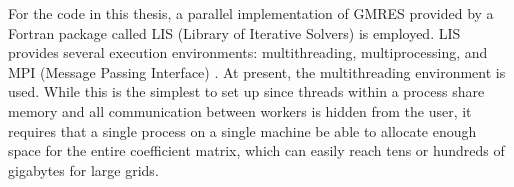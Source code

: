 For the code in this thesis, a parallel implementation of GMRES provided by a Fortran package called LIS (Library of Iterative Solvers) \cite{nishida_experience_2010} is employed.
LIS provides several execution environments: multithreading, multiprocessing, and MPI (Message Passing Interface) \cite{message_passing_interface_forum_mpi:_1993}.
At present, the multithreading environment is used.
While this is the simplest to set up since threads within a process share memory and all communication between workers is hidden from the user, it requires that a single process on a single machine be able to allocate enough space for the entire coefficient matrix, which can easily reach tens or hundreds of gigabytes for large grids.


